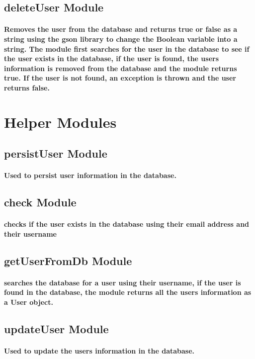 \documentclass[11pt,a4paper]{article}
\begin{document}
\subsection{deleteUser Module}
\paragraph{Removes the user from the database and returns true or false as a string using the gson library to change the Boolean variable into a string. The module first searches for the user in the database to see if the user exists in the database, if the user is found, the users information is removed from the database and the module returns true. If the user is not found, an exception is thrown and the user returns false.}

\section{Helper Modules}

\subsection{persistUser Module}
\paragraph{Used to persist user information in the database.}

\subsection{check Module}
\paragraph{checks if the user exists in the database using their email address and their username}

\subsection{getUserFromDb Module}
\paragraph{searches the database for a user using their username, if the user is found in the database, the module returns all the users information as a User object.}

\subsection{updateUser Module}
\paragraph{Used to update the users information in the database.}
\end{document}
